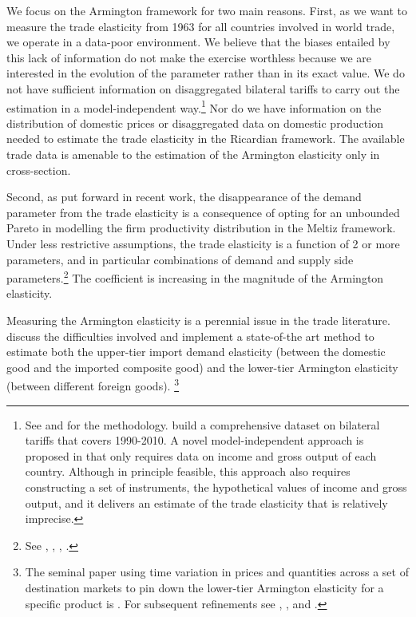 \documentclass[12pt,twoside,a4paper,notitlepage]{article}
\begin{document}
We focus on the Armington framework for two main reasons. 
First, as we want to measure the trade elasticity from 1963 for all countries involved in world trade, we operate in a data-poor environment. 
We believe that the biases entailed by this lack of information do not make the exercise worthless because we are interested in the evolution of the parameter rather than in its exact value.
We do not have sufficient information on disaggregated bilateral tariffs to carry out the estimation in a model-independent way.\footnote{See \cite{Head2001} and \cite{Caliendo2015} for the methodology.
\cite{Caliendo2015a} build a comprehensive dataset on bilateral tariffs that covers 1990-2010.
A novel model-independent approach is proposed in \cite{Allen2019} that only requires data on income and gross output of each country.
Although in principle feasible, this approach also requires constructing a set of instruments, the hypothetical values of income and gross output, and it delivers an estimate of the trade elasticity that is relatively imprecise.} 
Nor do we have information on the distribution of domestic prices or disaggregated data on domestic production needed to estimate the trade elasticity in the Ricardian framework.
The available trade data is amenable to the estimation of the Armington elasticity only in cross-section.
 
Second, as put forward in recent work, the disappearance of the demand parameter from the trade elasticity is a consequence of opting for an unbounded Pareto in modelling the firm productivity distribution in the Meltiz framework. Under less restrictive assumptions, the trade elasticity is a function of 2 or more parameters, and in particular combinations of demand and supply side parameters.\footnote{See \cite{Costinot2014}, \cite{Bas2017}, \cite{Feenstra2018}, \cite{Feenstra2018a}.} The coefficient is increasing in the magnitude of the Armington elasticity.

Measuring the Armington elasticity is a perennial issue in the trade literature. 
\cite{Feenstra2018} discuss the difficulties involved and implement a state-of-the art method to estimate both the upper-tier import demand elasticity (between the domestic good and the imported composite good) and the lower-tier Armington elasticity (between different foreign goods).
\footnote{The seminal paper using time variation in prices and quantities across a set of destination markets to pin down the lower-tier Armington elasticity for a specific product is \cite{Feenstra1994}. For subsequent refinements see \cite{Broda2006b}, \cite{Imbs2015}, and \cite{Soderbery2015}.}
\end{document}
